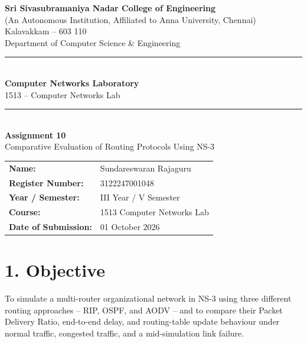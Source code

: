 \documentclass[11pt]{article}
\title{\vspace{-2cm}}
\date{}
\begin{document}
\begin{titlepage}
\centering
\vspace*{1cm}
{\large \textbf{Sri Sivasubramaniya Nadar College of Engineering}}\\
{\small (An Autonomous Institution, Affiliated to Anna University, Chennai)}\\
{\small Kalavakkam -- 603 110}\\[0.3cm]
{\small Department of Computer Science \& Engineering}\\[1.5cm]

\rule{\linewidth}{0.5mm}\\[0.4cm]
{\LARGE \textbf{Computer Networks Laboratory}}\\[0.3cm]
{\Large 1513 -- Computer Networks Lab}\\[0.4cm]
\rule{\linewidth}{0.5mm}\\[1.5cm]

{\huge \textbf{Assignment 10}}\\[0.4cm]
{\Large Comparative Evaluation of Routing Protocols Using NS-3}\\[2cm]

\begin{center}
\begin{tabular}{ll}
\textbf{Name:} & Sundareswaran Rajaguru \\[0.2cm]
\textbf{Register Number:} & 3122247001048 \\[0.2cm]
\textbf{Year / Semester:} & III Year / V Semester \\[0.2cm]
\textbf{Course:} & 1513 Computer Networks Lab \\[0.2cm]
\textbf{Date of Submission:} & 01 October 2026 \\[0.2cm]
\end{tabular}
\end{center}

\vfill
\end{titlepage}

\section*{1. Objective}
To simulate a multi-router organizational network in NS-3 using three
different routing approaches -- RIP, OSPF, and AODV -- and to compare their
Packet Delivery Ratio, end-to-end delay, and routing-table update behaviour
under normal traffic, congested traffic, and a mid-simulation link failure.
\end{document}
